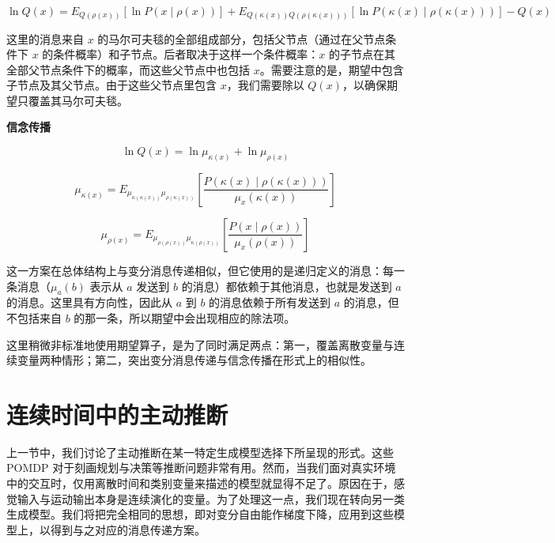 \begin{equation}
\ln Q(x)
= E_{Q(\rho(x))}[\ln P(x \mid \rho(x))]
+ E_{Q(\kappa(x))Q(\rho(\kappa(x)))}[\ln P(\kappa(x) \mid \rho(\kappa(x)))]
- Q(x)
\end{equation}

这里的消息来自 $x$ 的马尔可夫毯的全部组成部分，包括父节点（通过在父节点条件下 $x$ 的条件概率）和子节点。后者取决于这样一个条件概率：$x$ 的子节点在其全部父节点条件下的概率，而这些父节点中也包括 $x$。需要注意的是，期望中包含子节点及其父节点。由于这些父节点里包含 $x$，我们需要除以 $Q(x)$，以确保期望只覆盖其马尔可夫毯。

\textbf{信念传播}

\begin{equation}
\ln Q(x) = \ln \mu_{\kappa(x)} + \ln \mu_{\rho(x)}
\end{equation}

\begin{equation}
\mu_{\kappa(x)}
= E_{\mu_{\kappa(\kappa(x))}\mu_{\rho(\kappa(x))}}
\left[
\frac{P(\kappa(x) \mid \rho(\kappa(x)))}{\mu_x(\kappa(x))}
\right]
\end{equation}

\begin{equation}
\mu_{\rho(x)}
= E_{\mu_{\rho(\rho(x))}\mu_{\kappa(\rho(x))}}
\left[
\frac{P(x \mid \rho(x))}{\mu_x(\rho(x))}
\right]
\end{equation}

这一方案在总体结构上与变分消息传递相似，但它使用的是递归定义的消息：每一条消息（$\mu_a(b)$ 表示从 $a$ 发送到 $b$ 的消息）都依赖于其他消息，也就是发送到 $a$ 的消息。这里具有方向性，因此从 $a$ 到 $b$ 的消息依赖于所有发送到 $a$ 的消息，但不包括来自 $b$ 的那一条，所以期望中会出现相应的除法项。

这里稍微非标准地使用期望算子，是为了同时满足两点：第一，覆盖离散变量与连续变量两种情形；第二，突出变分消息传递与信念传播在形式上的相似性。

\section{连续时间中的主动推断}

上一节中，我们讨论了主动推断在某一特定生成模型选择下所呈现的形式。这些 POMDP 对于刻画规划与决策等推断问题非常有用。然而，当我们面对真实环境中的交互时，仅用离散时间和类别变量来描述的模型就显得不足了。原因在于，感觉输入与运动输出本身是连续演化的变量。为了处理这一点，我们现在转向另一类生成模型。我们将把完全相同的思想，即对变分自由能作梯度下降，应用到这些模型上，以得到与之对应的消息传递方案。

